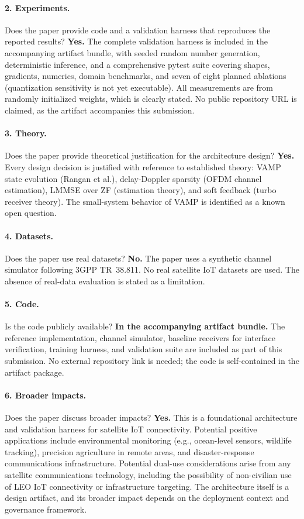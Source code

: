 \documentclass{article}
\begin{document}
\paragraph{2. Experiments.}
Does the paper provide code and a validation harness that reproduces the reported results?
\textbf{Yes.} The complete validation harness is included in the accompanying artifact bundle, with seeded random number generation, deterministic inference, and a comprehensive pytest suite covering shapes, gradients, numerics, domain benchmarks, and seven of eight planned ablations (quantization sensitivity is not yet executable). All measurements are from randomly initialized weights, which is clearly stated. No public repository URL is claimed, as the artifact accompanies this submission.

\paragraph{3. Theory.}
Does the paper provide theoretical justification for the architecture design?
\textbf{Yes.} Every design decision is justified with reference to established theory: VAMP state evolution (Rangan et al.), delay-Doppler sparsity (OFDM channel estimation), LMMSE over ZF (estimation theory), and soft feedback (turbo receiver theory). The small-system behavior of VAMP is identified as a known open question.

\paragraph{4. Datasets.}
Does the paper use real datasets?
\textbf{No.} The paper uses a synthetic channel simulator following 3GPP TR~38.811. No real satellite IoT datasets are used. The absence of real-data evaluation is stated as a limitation.

\paragraph{5. Code.}
Is the code publicly available?
\textbf{In the accompanying artifact bundle.} The reference implementation, channel simulator, baseline receivers for interface verification, training harness, and validation suite are included as part of this submission. No external repository link is needed; the code is self-contained in the artifact package.

\paragraph{6. Broader impacts.}
Does the paper discuss broader impacts?
\textbf{Yes.} This is a foundational architecture and validation harness for satellite IoT connectivity. Potential positive applications include environmental monitoring (e.g., ocean-level sensors, wildlife tracking), precision agriculture in remote areas, and disaster-response communications infrastructure. Potential dual-use considerations arise from any satellite communications technology, including the possibility of non-civilian use of LEO IoT connectivity or infrastructure targeting. The architecture itself is a design artifact, and its broader impact depends on the deployment context and governance framework.
\end{document}
